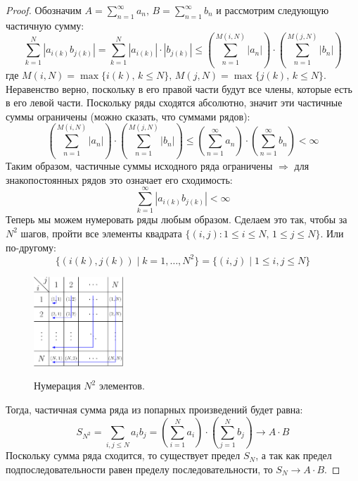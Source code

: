 \documentclass[12pt]{article}
\theoremstyle{definition}
\DeclareMathOperator*{\dsum}{\displaystyle\sum}
\begin{document}
\begin{proof}
	Обозначим $A = \dsum\limits_{n = 1}^{\infty} a_n, \, B = \dsum\limits_{n = 1}^{\infty} b_n$ и рассмотрим следующую частичную сумму:
	$$
		\dsum\limits_{k = 1}^{N}\left|a_{i(k)}b_{j(k)} \right| = \dsum\limits_{k = 1}^{N}\left|a_{i(k)}\right|{\cdot}\left|b_{j(k)} \right| \leq 
		\left(\dsum\limits_{n = 1}^{M(i,N)}\left|a_n\right|\right){\cdot}
		\left(\dsum\limits_{n = 1}^{M(j,N)}\left|b_n\right|\right)
	$$
	где $M(i,N) = \max\{i(k), \, k \leq N\}, \, M(j,N) = \max\{j(k), \, k \leq N\}$. Неравенство верно, поскольку в его правой части будут все члены, которые есть в его левой части. Поскольку ряды сходятся абсолютно, значит эти частичные суммы ограничены (можно сказать, что суммами рядов):
	$$
		\left(\dsum\limits_{n = 1}^{M(i,N)}\left|a_n\right|\right){\cdot}
		\left(\dsum\limits_{n = 1}^{M(j,N)}\left|b_n\right|\right) \leq
		\left(\dsum\limits_{n = 1 }^{\infty}a_n \right) {\cdot} \left(\dsum\limits_{n = 1 }^{\infty} b_n\right) < \infty
	$$
	Таким образом, частичные суммы исходного ряда ограничены $\Rightarrow$ для знакопостоянных рядов это означает его сходимость:
	$$
		\dsum\limits_{k = 1}^{\infty}\left|a_{i(k)}b_{j(k)} \right| < \infty
	$$
	Теперь мы можем нумеровать ряды любым образом. Сделаем это так, чтобы за $N^2$ шагов, пройти все элементы квадрата $\{(i,j) \colon 1 \leq i \leq N, \, 1 \leq j \leq N \}$. Или по-другому:
	$$
		\{\left(i(k), j(k)\right) \mid k = 1, \dotsc, N^2\} = \{(i,j) \mid 1 \leq i, j \leq N \}
	$$
	\begin{figure}[H]
		\centering
		\includegraphics[width=0.3\textwidth]{MA3L5_1.eps}
		\label{5_1}
		\caption{Нумерация $N^2$ элементов.}
		\label{fig:Нумерация}
	\end{figure}
	Тогда, частичная сумма ряда из попарных произведений будет равна:
	$$
		S_{N^2} = \dsum\limits_{i,j \leq N} a_i b_j = 	\left(\dsum\limits_{i = 1 }^{N}a_i \right) {\cdot} \left(\dsum\limits_{j = 1 }^{N} b_j\right) \to A{\cdot}B
	$$
	Поскольку сумма ряда сходится, то существует предел $S_N$, а так как предел подпоследовательности равен пределу последовательности, то $S_N \to A{\cdot}B$.
\end{proof}
\end{document}
